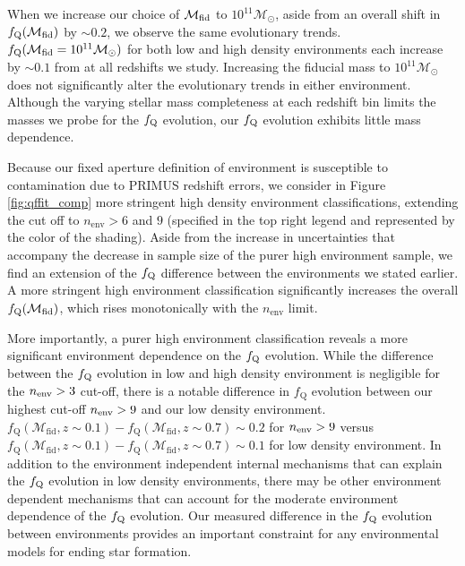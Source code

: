 \documentclass{emulateapj}
\begin{document}
When we increase our choice of $\mathcal{M}_{\rm{fid}}$ to $10^{11}
\mathcal{M}_\odot$, aside from an overall shift in
$f_{\rm{Q}}(\mathcal{M}_{\rm{fid}})$ by $\sim 0.2$, we observe the
same evolutionary trends. $f_{\rm{Q}}(\mathcal{M}_{\rm{fid}} =
10^{11}\mathcal{M}_{\odot})$ for both low and high density
environments each increase by $\sim 0.1$ from at all redshifts we
study. Increasing the fiducial mass to $10^{11}
\mathcal{M}_{\odot}$ does not significantly alter the evolutionary
trends in either environment. Although the varying stellar mass
completeness at each redshift bin limits the masses we probe for the
$f_{\rm{Q}}$ evolution, our $f_{\rm{Q}}$ evolution exhibits little
mass dependence.

Because our fixed aperture definition of environment is susceptible to
contamination due to PRIMUS redshift errors, we consider in Figure
\ref{fig:qffit_comp} more stringent high density environment
classifications, extending the cut off to $n_{\mathrm{env}} > 6$ and
$9$ (specified in the top right legend and represented by the color of
the shading). Aside from the increase in uncertainties that accompany
the decrease in sample size of the purer high environment sample, we
find an extension of the $f_{\rm{Q}}$ difference between the
environments we stated earlier. A more stringent high environment
classification significantly increases the overall
$f_{\rm{Q}}(\mathcal{M}_{\rm{fid}})$, which rises monotonically with
the $n_{\mathrm{env}}$ limit.

More importantly, a purer high environment classification reveals a
more significant environment dependence on the $f_{\rm{Q}}$
evolution. While the difference between the $f_{\rm{Q}}$ evolution in
low and high density environment is negligible for the $n_{\rm{env}} >
3$ cut-off, there is a notable difference in $f_{\mathrm{Q}}$
evolution between our highest cut-off $n_{\rm{env}} > 9$ and our low
density environment. $f_{\mathrm{Q}}(\mathcal{M}_{\mathrm{fid}}, z
\sim 0.1) - f_{\mathrm{Q}}(\mathcal{M}_{\mathrm{fid}}, z \sim 0.7)
\sim 0.2$ for $n_{\rm{env}} > 9$ versus
$f_{\mathrm{Q}}(\mathcal{M}_{\mathrm{fid}}, z \sim 0.1) -
f_{\mathrm{Q}}(\mathcal{M}_{\mathrm{fid}}, z \sim 0.7) \sim 0.1$ for
low density environment. In addition to the
environment independent internal mechanisms that can explain the
$f_{\rm{Q}}$ evolution in low density environments, there may be other
environment dependent mechanisms that can account for the moderate
environment dependence of the $f_{\rm{Q}}$ evolution. Our measured
difference in the $f_{\rm{Q}}$ evolution between environments provides
an important constraint for any environmental models for ending star
formation.
\end{document}
